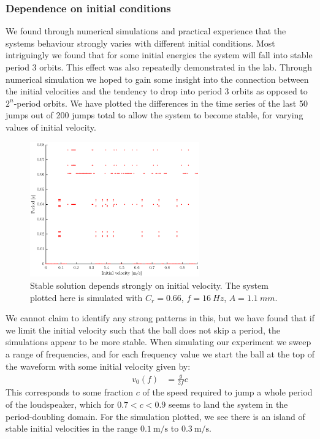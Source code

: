 \documentclass[12pt,oneside,a4paper]{article}
\numberwithin{equation}{section}
\begin{document}
{{{{\subsubsection{Dependence on initial conditions}
We found through numerical simulations and practical experience that the systems behaviour strongly varies with different initial conditions. Most intriguingly we found that for some initial energies the system will fall into stable period 3 orbits. This effect was also repeatedly demonstrated in the lab. Through numerical simulation we hoped to gain some insight into the connection between the initial velocities and the tendency to drop into period 3 orbits as opposed to $2^n$-period orbits. We have plotted the differences in the time series of the last 50 jumps out of 200 jumps total to allow the system to become stable, for varying values of initial velocity. 
\begin{figure}[h]
\centering
\includegraphics[width=0.65\textwidth]{vsweep.eps}
\caption{Stable solution depends strongly on initial velocity. The system plotted here is simulated with $C_r=0.66$, $f=\SI{16}{Hz}$, $A=\SI{1.1}{mm}$.}
\end{figure}
We cannot claim to identify any strong patterns in this, but we have found that if we limit the initial velocity such that the ball does not skip a period, the simulations appear to be more stable. When simulating our experiment we sweep a range of frequencies, and for each frequency value we start the ball at the top of the waveform with some initial velocity given by:
\begin{align*}
v_0(f) &= \frac{g}{2f} c
\end{align*}
This corresponds to some fraction $c$ of the speed required to jump a whole period of the loudspeaker, which for $0.7<c<0.9$ seems to land the system in the period-doubling domain. For the simulation plotted, we see there is an island of stable initial velocities in the range $\SI{0.1}{\meter\per\second}$ to $\SI{0.3}{\meter\per\second}$.
}}}}
\end{document}
